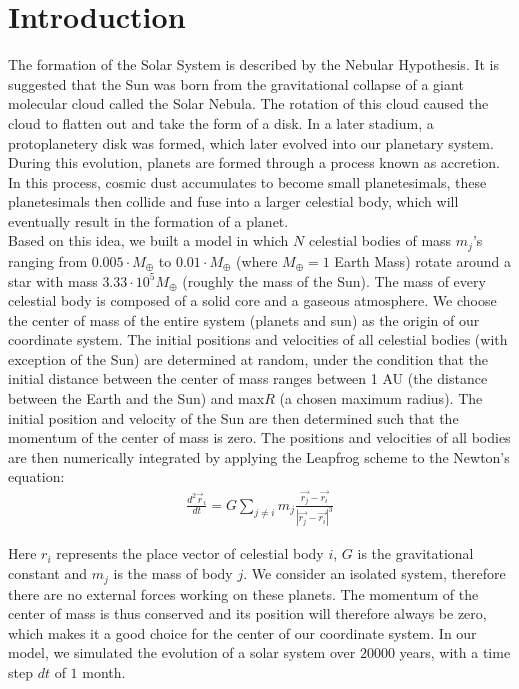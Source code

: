 \section{Introduction}
The formation of the Solar System is described by the Nebular Hypothesis. It is suggested that the Sun was born from the gravitational collapse of a giant molecular cloud called the Solar Nebula. 
The rotation of this cloud caused the cloud to flatten out and take the form of a disk. In a later stadium, a protoplanetery disk was formed, which later evolved into our planetary system.
During this evolution, planets are formed through a process known as accretion.
In this process, cosmic dust accumulates to become small planetesimals, these planetesimals then collide and fuse into a larger celestial body, which will eventually result in the formation of a planet.\\

Based on this idea, we built a model in which \(N\) celestial bodies of mass $m_j$'s ranging from $0.005\cdot M_{\oplus}$ to $0.01\cdot M_{\oplus}$ (where $M_{\oplus}=1$ Earth Mass) rotate around a star with mass $3.33\cdot 10^5 M_{\oplus}$ (roughly the mass of the Sun).
The mass of every celestial body is composed of a solid core and a gaseous atmosphere.
We choose the center of mass of the entire system (planets and sun) as the origin of our coordinate system. 
The initial positions and velocities of all celestial bodies (with exception of the Sun) are determined at random, under the condition that the initial distance between the center of mass ranges between 1 AU (the distance between the Earth and the Sun) and  max\(R\) (a chosen maximum radius). 
The initial position and velocity of the Sun are then determined such that the momentum of the center of mass is zero. 
The positions and velocities of all bodies are then numerically integrated by applying the Leapfrog scheme to the Newton's equation:
\begin{align}
\frac{d^2\vec{r}_i}{dt}=G\sum_{j\neq i}m_j\frac{\vec{r_j}-\vec{r_i}}{|\vec{r_j}-\vec{r_i}|^3}\label{eq:newton}
\end{align}

Here \(r_i\) represents the place vector of celestial body \(i\), \(G\) is the gravitational constant and \(m_j\) is the mass of body \(j\).
We consider an isolated system, therefore there are no external forces working on these planets. 
The momentum of the center of mass is thus conserved and its position will therefore always be zero, which makes it a good choice for the center of our coordinate system. 
In our model, we simulated the evolution of a solar system over $20000$ years, with a time step $dt$ of $1$ month.\\

